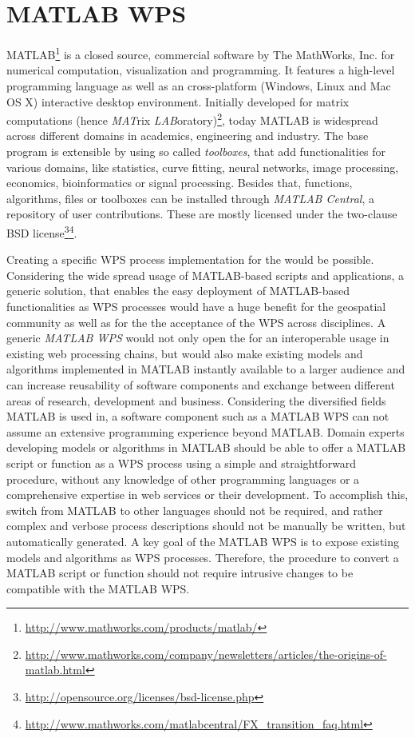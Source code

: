 
\chapter{MATLAB WPS}
\label{sec:matlabwps}

MATLAB\footnote{\url{http://www.mathworks.com/products/matlab/}} is a closed source, commercial software by The MathWorks, Inc. for numerical computation, visualization and programming. It features a high-level programming language as well as an cross-platform (Windows, Linux and Mac OS X) interactive desktop environment. Initially developed for matrix computations (hence \emph{MAT}rix \emph{LAB}oratory)\footnote{\url{http://www.mathworks.com/company/newsletters/articles/the-origins-of-matlab.html}}, today MATLAB is widespread across different domains in academics, engineering and industry. The base program is extensible by using so called \emph{toolboxes}, that add functionalities for various domains, like statistics, curve fitting, neural networks, image processing, economics, bioinformatics or signal processing. Besides that, functions, algorithms, files or toolboxes can be installed through \emph{MATLAB Central}, a repository of user contributions. These are mostly licensed under the two-clause BSD license\footnote{\url{http://opensource.org/licenses/bsd-license.php}}\multiplefootnoteseparator\footnote{\url{http://www.mathworks.com/matlabcentral/FX_transition_faq.html}}.

Creating a specific \ac{WPS} process implementation for the \la would be possible. Considering the wide spread usage of MATLAB-based scripts and applications, a generic solution, that enables the easy deployment of MATLAB-based functionalities as \ac{WPS} processes would have a huge benefit for the geospatial community as well as for the the acceptance of the \ac{WPS} across disciplines. A generic \emph{MATLAB WPS} would not only open the \la for an interoperable usage in existing web processing chains, but would also make existing models and algorithms implemented in MATLAB instantly available to a larger audience and can increase reusability of software components and exchange between different areas of research, development and business. Considering the diversified fields MATLAB is used in, a software component such as a MATLAB WPS can not assume an extensive programming experience beyond MATLAB. Domain experts developing models or algorithms in MATLAB should be able to offer a MATLAB script or function as a \ac{WPS} process using a simple and straightforward procedure, without any knowledge of other programming languages or a comprehensive expertise in web services or their development. To accomplish this, switch from MATLAB to other languages should not be required, and rather complex and verbose process descriptions should not be manually be written, but automatically generated. A key goal of the MATLAB WPS is to expose existing models and algorithms as \ac{WPS} processes. Therefore, the procedure to convert a MATLAB script or function should not require intrusive changes to be compatible with the MATLAB WPS.

